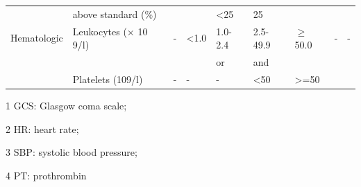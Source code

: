 \documentclass[12pt,a4paper,english
]{tunithesis}
\begin{document}
\begin{landscape}
\begin{table}[]
\begin{threeparttable}
\begin{tabular}{lllllllll}
             & above standard (\%) &  &  & \textless{}25 & 25 &  &  &  \\
            Hematologic & Leukocytes (× 10 9/l) & - & \textless{}1.0 & 1.0-2.4 & 2.5-49.9 & $\geq$50.0 & - & - \\
             &  &  &  & or & and &  &  &  \\
             & Platelets (109/l) & - & - & - & \textless{}50 & \textgreater{}=50 &  &  \\
             \hline
        \end{tabular}
        \begin{tablenotes}
            \item[1] GCS: Glasgow coma scale; 
            \item[2] HR: heart rate; 
            \item[3] SBP: systolic blood pressure;        
            \item[4] PT: prothrombin
        \end{tablenotes}
        \end{threeparttable}
    \end{table}
\end{landscape}
\end{document}

